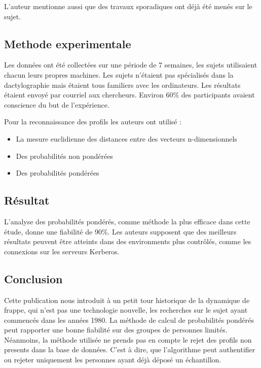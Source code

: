 L’auteur mentionne aussi que des travaux sporadiques ont déjà été menés sur le sujet.\\

\subsection{Methode experimentale}

Les données ont été collectées sur une période de 7 semaines, les sujets utilisaient chacun leurs propres machines. Les sujets n’étaient pas spécialisés dans la dactylographie mais étaient tous familiers avec les ordinateurs. Les résultats étaient envoyé par courriel aux chercheurs. Environ 60\% des participants avaient conscience du but de l’expérience.

Pour la reconnaissance des profils les auteurs ont utilisé :\\

\begin{itemize}
\item La mesure euclidienne des distances entre des vecteurs n-dimensionnels
\item Des probabilités non pondérées
\item Des probabilités pondérées
\end{itemize}

\subsection{Résultat}

L’analyse des probabilités pondérés, comme méthode la plus efficace dans cette étude, donne une fiabilité de 90\%. Les auteurs supposent que des meilleurs résultats peuvent être atteints dans des environments plus contrôlés, comme les connexions sur les serveurs Kerberos.

\subsection{Conclusion}

Cette publication nous introduit à un petit tour historique de la dynamique de frappe, qui n'est pas une technologie nouvelle, les recherches sur le sujet ayant commencés dans les années 1980. La méthode de calcul de probabilités pondérés peut rapporter une bonne fiabilité sur des groupes de personnes limités. Néanmoins, la méthode utilisée ne prends pas en compte le rejet des profils non presents dans la base de données. C’est à dire, que l’algorithme peut authentifier ou rejeter uniquement les personnes ayant déjà déposé un échantillon.
